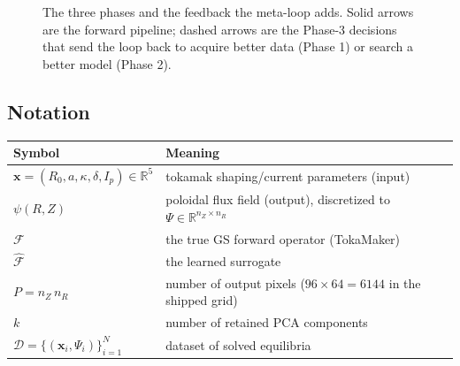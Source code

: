 \documentclass[11pt]{article}
\newcommand{\bx}{\mathbf{x}}
\newcommand{\Ffwd}{\mathcal{F}}
\newcommand{\Fhat}{\hat{\mathcal{F}}}
\newcommand{\R}{\mathbb{R}}
\begin{document}
\begin{figure}[h]
\centering
{}
\caption{The three phases and the feedback the meta-loop adds. Solid arrows are the forward
pipeline; dashed arrows are the Phase-3 decisions that send the loop back to acquire better data
(Phase 1) or search a better model (Phase 2).}
\label{fig:phases}
\end{figure}

\subsection{Notation}
\begin{center}
\begin{tabular}{@{}ll@{}}
\toprule
Symbol & Meaning \\
\midrule
$\bx=(R_0, a, \kappa, \delta, I_p)\in\R^5$ & tokamak shaping/current parameters (input) \\
$\psi(R,Z)$ & poloidal flux field (output), discretized to $\Psi\in\R^{n_Z\times n_R}$ \\
$\Ffwd$ & the true GS forward operator (TokaMaker) \\
$\Fhat$ & the learned surrogate \\
$P=n_Z\,n_R$ & number of output pixels ($96\times 64=6144$ in the shipped grid) \\
$k$ & number of retained PCA components \\
$\mathcal{D}=\{(\bx_i,\Psi_i)\}_{i=1}^N$ & dataset of solved equilibria \\
\bottomrule
\end{tabular}
\end{center}
\end{document}
